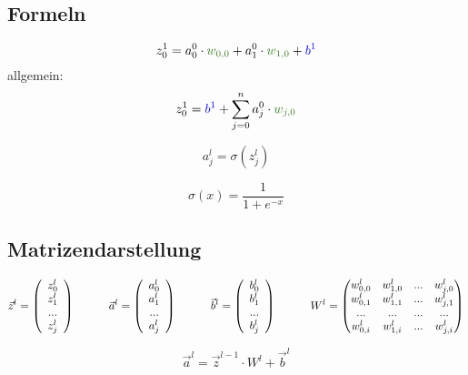 \documentclass{article}
\begin{document}
\subsection{Formeln}

\[ z_0^1 = a_0^0 \cdot \textcolor{OliveGreen}{w_{0,0}} + a_1^0 \cdot \textcolor{OliveGreen}{w_{1,0}} + \textcolor{blue}{b^1} \]
allgemein:
\[  z_0^1 = \textcolor{blue}{b^1} + \sum_{j=0}^{n} a_j^0 \cdot \textcolor{OliveGreen}{w_{j,0}}  \]

\[a_j^l = \sigma(z_j^l)\]

\[\sigma(x) = \frac{1}{1 + e^{-x}}\]


\pagebreak
\subsection{Matrizendarstellung}

\[ \vec{z}^l = \left(\begin{array}{c} z_0^l \\ z_1^l \\ ... \\ z_j^l \end{array}\right) 
\kern 30pt
\vec{a}^l = \left(\begin{array}{c} a_0^l \\ a_1^l \\ ... \\ a_j^l \end{array}\right) 
\kern 30pt
\vec{b}^l = \left(\begin{array}{c} b_0^l \\ b_1^l \\ ... \\ b_j^l \end{array}\right) 
\kern 30pt
W^l = \begin{pmatrix}
    w_{0,0}^l & w_{1,0}^l & ... & w_{j,0}^l \\
    w_{0,1}^l & w_{1,1}^l & ... & w_{j,1}^l \\
    ... & ... & ... & ... \\
    w_{0,i}^l & w_{1,i}^l & ... & w_{j,i}^l
\end{pmatrix} \]

\[ \vec{a}^l = \vec{z}^{l-1} \cdot W^l + \vec{b}^l \]
\end{document}
